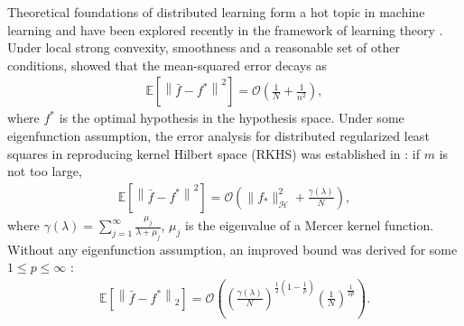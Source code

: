 \documentclass{article}
\begin{document}
Theoretical foundations of distributed learning form a hot topic in machine learning
and have been explored recently in the framework of learning theory \cite{zhang2012communication,Zhang2013,lin2017distributed,guo2017learning}.
Under local strong convexity, smoothness and a reasonable set of other conditions, \cite{zhang2012communication} showed that the mean-squared error
decays as
\begin{align*}
  \mathbb{E}\left[\left\|\bar{f}-f^\ast\right\|^2\right]=\mathcal{O}\left(\frac{1}{N}+\frac{1}{n^2}\right),
\end{align*}
where $f^\ast$ is the optimal hypothesis in the hypothesis space.
Under some eigenfunction assumption,
the error analysis for distributed regularized
least squares in reproducing kernel Hilbert space (RKHS) was established in \cite{Zhang2013}:
if $m$ is not too large,
\begin{align*}
  \mathbb{E}\left[\left\|\bar{f}-f^\ast\right\|^2\right]=\mathcal{O}\left(\|f_\ast\|_\mathcal{H}^2+\frac{\gamma(\lambda)}{N}\right),
\end{align*}
where $\gamma(\lambda)=\sum_{j=1}^\infty\frac{\mu_j}{\lambda+\mu_j}$,
$\mu_j$ is the eigenvalue of a Mercer kernel function.
Without any eigenfunction assumption,
 an improved bound was derived for some $1\leq p\leq\infty$ \cite{lin2017distributed}:
\begin{align*}
  \mathbb{E}\left[\left\|\bar{f}-f^\ast\right\|_2\right]=
  \mathcal{O}\left(\left(\frac{\gamma(\lambda)}{N}\right)^{\frac{1}{2}(1-\frac{1}{p})}\left(\frac{1}{N}\right)^{\frac{1}{2p}}\right).
\end{align*}
\end{document}

